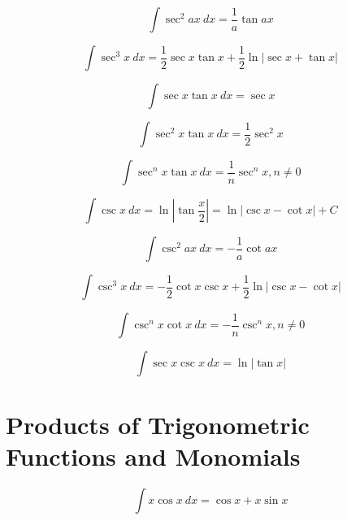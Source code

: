\documentclass[12pt,a4paper,leqno]{article}
\begin{document}
   \begin{equation}
   \int \sec^2 ax\ dx = \frac{1}{a} \tan ax
   \end{equation}

   \begin{equation}\label{eq:Kloeppel}
   \int \sec^3 x \ {dx} = \frac{1}{2} \sec x \tan x + \frac{1}{2}\ln | \sec x + \tan x |
   \end{equation}

   \begin{equation}
   \int \sec x \tan x\ dx = \sec x
   \end{equation}

   \begin{equation}
   \int \sec^2 x \tan x\ dx = \frac{1}{2} \sec^2 x
   \end{equation}

   \begin{equation}
   \int \sec^n x \tan x \ dx = \frac{1}{n} \sec^n x , n\ne 0
   \end{equation}

   \begin{equation}
   \int \csc x\ dx = \ln \left | \tan \frac{x}{2} \right|  = \ln | \csc x - \cot x| + C
   \end{equation}

   \begin{equation}
   \int \csc^2 ax\ dx = -\frac{1}{a} \cot ax
   \end{equation}

   \begin{equation}
   \int \csc^3 x\ dx = -\frac{1}{2}\cot x \csc x + \frac{1}{2} \ln | \csc x - \cot x |
   \end{equation}

   \begin{equation}
   \int \csc^nx \cot x\ dx = -\frac{1}{n}\csc^n x, n\ne 0
   \end{equation}

   \begin{equation}
   \int \sec x \csc x \ dx = \ln | \tan x |
   \end{equation}


   \section*{Products of Trigonometric Functions and Monomials}


  \begin{equation}
  \int x \cos x \ dx = \cos x + x \sin x
  \end{equation}
\end{document}
